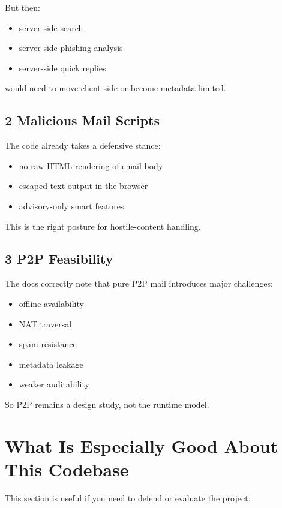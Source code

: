 \documentclass[11pt,a4paper]{article}
\begin{document}
But then:

\begin{itemize}
\item server-side search
\item server-side phishing analysis
\item server-side quick replies
\end{itemize}

would need to move client-side or become metadata-limited.

\subsection{2 Malicious Mail Scripts}

The code already takes a defensive stance:

\begin{itemize}
\item no raw HTML rendering of email body
\item escaped text output in the browser
\item advisory-only smart features
\end{itemize}

This is the right posture for hostile-content handling.

\subsection{3 P2P Feasibility}

The docs correctly note that pure P2P mail introduces major challenges:

\begin{itemize}
\item offline availability
\item NAT traversal
\item spam resistance
\item metadata leakage
\item weaker auditability
\end{itemize}

So P2P remains a design study, not the runtime model.


\section{What Is Especially Good About This Codebase}

This section is useful if you need to defend or evaluate the project.
\end{document}
